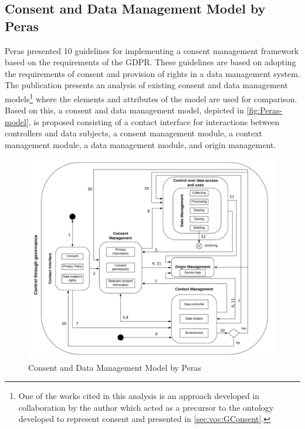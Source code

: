 \subsection*{Consent and Data Management Model by Peras}
Peras \cite{peras_guidelines_2018} presented 10 guidelines for implementing a consent management framework based on the requirements of the GDPR. These guidelines are based on adopting the requirements of consent and provision of rights in a data management system. The publication presents an analysis of existing consent and data management models\footnote{One of the works cited in this analysis is an approach developed in collaboration by the author \cite{fatema_compliance_2017} which acted as a precursor to the ontology developed to represent consent and presented in \autoref{sec:voc:GConsent}.} where the elements and attributes of the model are used for comparison. Based on this, a consent and data management model, depicted in \autoref{fig:Peras-model}, is proposed consisting of a contact interface for interactions between controllers and data subjects, a consent management module, a context management module, a data management module, and origin management.
\begin{figure}[htbp]
    \centering
    \includegraphics[width=0.8\linewidth]{img/Peras_model.png}
    \caption{Consent and Data Management Model by Peras \cite{peras_guidelines_2018}}
    \label{fig:Peras-model}
\end{figure}

